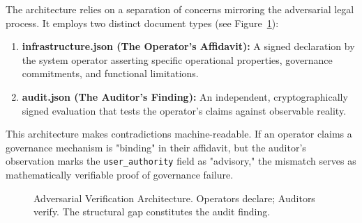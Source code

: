 \documentclass{article}
\begin{document}
The architecture relies on a separation of concerns mirroring the adversarial legal process. It employs two distinct document types (see Figure~\ref{fig:manifests}):

\begin{enumerate}
    \item \textbf{infrastructure.json (The Operator's Affidavit):} A signed declaration by the system operator asserting specific operational properties, governance commitments, and functional limitations.
    \item \textbf{audit.json (The Auditor's Finding):} An independent, cryptographically signed evaluation that tests the operator's claims against observable reality.
\end{enumerate}

This architecture makes contradictions machine-readable. If an operator claims a governance mechanism is "binding" in their affidavit, but the auditor's observation marks the \texttt{user\_authority} field as "advisory," the mismatch serves as mathematically verifiable proof of governance failure.

\begin{figure}[htbp]
\centering
{}
\caption{Adversarial Verification Architecture. Operators declare; Auditors verify. The structural gap constitutes the audit finding.}
\label{fig:manifests}
\end{figure}
\end{document}
